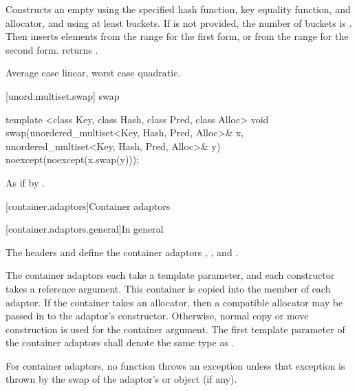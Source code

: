\begin{itemdescr}
\pnum\effects
Constructs an empty  using the
specified hash function, key equality function, and allocator, and
using at least  buckets. If  is not
provided, the number of buckets is . Then
inserts elements from the range 
for the first form, or from the range
 for the second form.
 returns .

\pnum\complexity Average case linear, worst case quadratic.
\end{itemdescr}

[unord.multiset.swap]{ swap}

%
%
\begin{itemdecl}
template <class Key, class Hash, class Pred, class Alloc>
  void swap(unordered_multiset<Key, Hash, Pred, Alloc>& x,
            unordered_multiset<Key, Hash, Pred, Alloc>& y)
    noexcept(noexcept(x.swap(y)));
\end{itemdecl}

\begin{itemdescr}
\pnum\effects As if by .
\end{itemdescr}


[container.adaptors]{Container adaptors}

[container.adaptors.general]{In general}

\pnum
The headers  and  define the container adaptors
, , and .

\pnum
The container adaptors each take a  template parameter, and each constructor takes
a  reference argument. This container is copied into the  member
of each adaptor. If the container takes an allocator, then a compatible allocator may be passed in
to the adaptor's constructor. Otherwise, normal copy or move construction is used for the container
argument.
The first template parameter  of the container adaptors
shall denote the same type as .

\pnum
For container adaptors, no  function throws an exception unless that
exception is thrown by the swap of the adaptor's  or
 object (if any).

